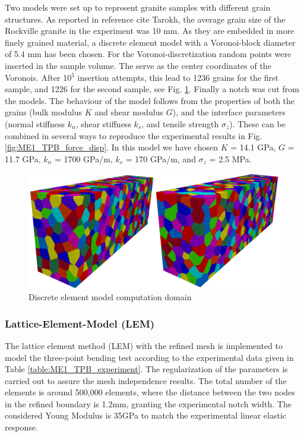 Two models were set up to represent granite samples with different grain structures. As reported in reference cite Tarokh, the average grain size of the Rockville granite in the experiment was 10 mm. 
As they are embedded in more finely grained material, a discrete element model with a Voronoi-block diameter of 5.4 mm has been chosen. For the Voronoi-discretization random points were inserted in the sample volume. 
The serve as the center coordinates of the Voronois. After 10$^5$ insertion attempts, this lead to 1236 grains for the first sample, and 1226 for the second sample, see Fig. \ref{fig:ME1_TPB_DEM_domain}. Finally a notch was cut from the models. The behaviour of the model follows from the properties of both the grains (bulk modulus $K$ and shear modulus $G$), and the interface parameters (normal stiffness $k_n$, shear stiffness $k_s$, and tensile strength $\sigma_z$). These can be combined in several ways to reproduce the experimental results in Fig. \ref{fig:ME1_TPB_force_disp}. In this model we have chosen $K$ = 14.1 GPa, $G$ = 11.7 GPa, $k_n$ = 1700 GPa/m, $k_s$ = 170 GPa/m, and $\sigma_z$ = 2.5 MPa. 

\begin{figure}[!ht]
\centering
\includegraphics[width=1\textwidth]{figures/ME1-DEM-samples.png}
\caption{Discrete element model computation domain}
\label{fig:ME1_TPB_DEM_domain}
\end{figure}

\subsubsection*{Lattice-Element-Model (LEM)}

The lattice element method (LEM) with the refined mesh is implemented to model the three-point bending test according to the experimental data given in Table \ref{table:ME1_TPB_experiment}. The regularization of the parameters is carried out to assure the mesh independence results. The total number of the elements is around 500,000 elements, where the distance between the two nodes in the refined boundary is 1.2mm, granting the experimental notch width. The considered Young Modulus is 35GPa to match the experimental linear elastic response.

